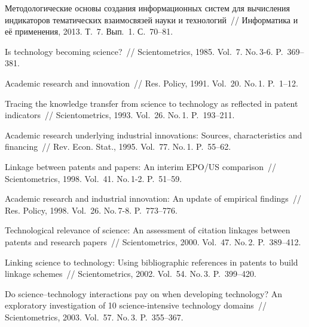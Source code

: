\begin{multicols}{2}
{}

{\small\frenchspacing
 {%
 \begin{thebibliography}{99}
Методологические основы создания информационных сис\-тем для вычисления
индикаторов тематиче\-ских взаимосвязей науки и технологий~// Информатика и её
применения, 2013. Т.~7. Вып.~1. С.~70--81.

 Is technology becoming science?~// Scientometrics, 1985.
Vol.~7. No.\,3-6. P.~369--381.

 Academic research and innovation~// Res. Policy, 1991.
Vol.~20. No.\,1. P.~1--12.

 Tracing the knowledge transfer from science to technology as
reflected in patent indicators~// Scientometrics, 1993. Vol.~26. No.\,1. P.~193--211.

 Academic research underlying industrial innovations: Sources,
characteristics and financing~// Rev. Econ. Stat., 1995. Vol.~77.
No.\,1. P.~55--62.


 Linkage between patents and papers: An interim EPO/US
comparison~// Scientometrics, 1998. Vol.~41. No.\,1-2. P.~51--59.


 Academic research and industrial innovation: An update of empirical
findings~// Res. Policy, 1998. Vol.~26. No.\,7-8. P.~773--776.

 Technological relevance of
science: An assessment of citation linkages between patents and research papers~//
Scientometrics, 2000. Vol.~47. No.\,2. P.~389--412.


Linking science to technology: Using bibliographic references in patents to build
linkage schemes~// Scientometrics, 2002. Vol.~54. No.\,3. P.~399--420.

 Do science--technology interactions pay on when developing
technology? An exploratory investigation of 10 science-intensive technology
domains~// Scientometrics, 2003. Vol.~57. No.\,3. P.~355--367.


\end{thebibliography}}}
\end{multicols}
